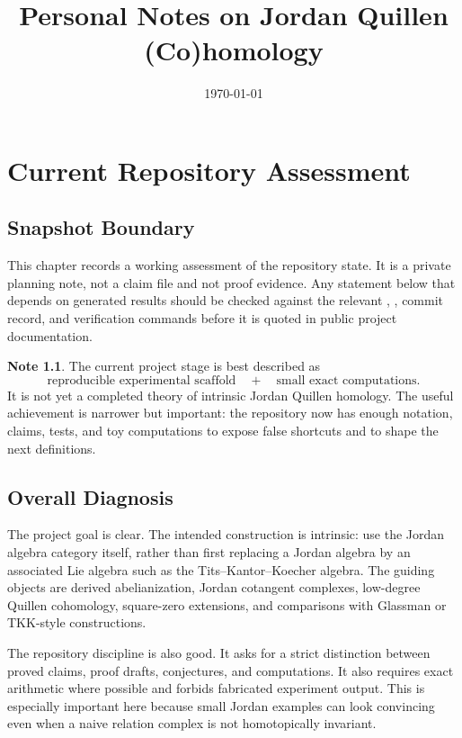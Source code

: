 \documentclass[11pt]{report}
\title{Personal Notes on Jordan Quillen (Co)homology}
\author{}
\date{\today}
\theoremstyle{definition}
\newtheorem{note}{Note}[chapter]
\theoremstyle{plain}
\begin{document}
\maketitle
\tableofcontents







\chapter{Current Repository Assessment}

\section{Snapshot Boundary}

This chapter records a working assessment of the repository state. It is a
private planning note, not a claim file and not proof evidence. Any statement
below that depends on generated results should be checked against the relevant
, , commit record, and verification
commands before it is quoted in public project documentation.

\begin{note}
The current project stage is best described as
\[
  \text{reproducible experimental scaffold}
  \quad+\quad
  \text{small exact computations}.
\]
It is not yet a completed theory of intrinsic Jordan Quillen homology. The
useful achievement is narrower but important: the repository now has enough
notation, claims, tests, and toy computations to expose false shortcuts and to
shape the next definitions.
\end{note}

\section{Overall Diagnosis}

The project goal is clear. The intended construction is intrinsic: use the
Jordan algebra category itself, rather than first replacing a Jordan algebra by
an associated Lie algebra such as the Tits--Kantor--Koecher algebra. The guiding
objects are derived abelianization, Jordan cotangent complexes, low-degree
Quillen cohomology, square-zero extensions, and comparisons with Glassman or
TKK-style constructions.

The repository discipline is also good. It asks for a strict distinction
between proved claims, proof drafts, conjectures, and computations. It also
requires exact arithmetic where possible and forbids fabricated experiment
output. This is especially important here because small Jordan examples can
look convincing even when a naive relation complex is not homotopically
invariant.
\end{document}
